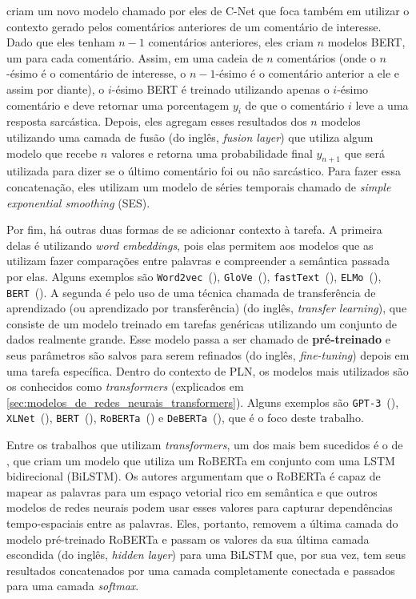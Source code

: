 \cite{jena-etal:2020:cnet} criam um novo modelo chamado por eles de C-Net que
foca também em utilizar o contexto gerado pelos comentários anteriores de um
comentário de interesse. Dado que eles tenham $n-1$ comentários anteriores, eles
criam $n$ modelos BERT, um para cada comentário. Assim, em uma cadeia de $n$
comentários (onde o $n$-ésimo é o comentário de interesse, o $n-1$-ésimo é o
comentário anterior a ele e assim por diante), o $i$-ésimo BERT é treinado
utilizando apenas o $i$-ésimo comentário e deve retornar uma porcentagem $y_i$
de que o comentário $i$ leve a uma resposta sarcástica. Depois, eles agregam
esses resultados dos $n$ modelos utilizando uma camada de fusão (do inglês,
\textit{fusion layer}) que utiliza algum modelo que recebe $n$ valores e retorna
uma probabilidade final $y_{n+1}$ que será utilizada para dizer se o último
comentário foi ou não sarcástico. Para fazer essa concatenação, eles utilizam
um modelo de séries temporais chamado de \textit{simple exponential smoothing}
(SES).

Por fim, há outras duas formas de se adicionar contexto à tarefa. A primeira
delas é utilizando \textit{word embeddings}, pois elas permitem aos modelos que
as utilizam fazer comparações entre palavras e compreender a semântica passada
por elas. Alguns exemplos são
\texttt{Word2vec}~(\cite{mikolov-etal:2013:word2vec}),
\texttt{GloVe}~(\cite{pennington-etal:2014:glove}),
\texttt{fastText}~(\cite{bojanowski-etal:2016:fasttext}),
\texttt{ELMo}~(\cite{peters-etal:2018:elmo}),
\texttt{BERT}~(\cite{devlin-etal:2018:bert}).
A segunda é pelo uso de uma técnica chamada de transferência de aprendizado (ou
aprendizado por transferência) (do inglês, \textit{transfer learning}),
que consiste de um modelo treinado em tarefas genéricas utilizando um conjunto
de dados realmente grande. Esse modelo passa a ser chamado de
\textbf{pré-treinado} e seus parâmetros são salvos para serem refinados (do
inglês, \textit{fine-tuning}) depois em uma tarefa específica.  Dentro do
contexto de PLN, os modelos mais utilizados são os conhecidos como
\textit{transformers} (explicados em
\ref{sec:modelos_de_redes_neurais_transformers}).
Alguns exemplos são
\texttt{GPT-3}~(\cite{brown-etal:2020:gpt3}),
\texttt{XLNet}~(\cite{yang-etal:2019:xlnet}),
\texttt{BERT}~(\cite{devlin-etal:2018:bert}),
\texttt{RoBERTa}~(\cite{liu-etal:2019:roberta})
e \texttt{DeBERTa}~(\cite{he-etal:2020:deberta}), que é o foco deste trabalho.

Entre os trabalhos que utilizam \textit{transformers}, um dos mais bem sucedidos
é o de \cite{potamias-etal:2020:transform-sarcasm}, que criam um modelo que
utiliza um RoBERTa em conjunto com uma LSTM bidirecional (BiLSTM). Os autores
argumentam que o RoBERTa é capaz de mapear as palavras para um espaço vetorial
rico em semântica e que outros modelos de redes neurais podem usar esses valores
para capturar dependências tempo-espaciais entre as palavras. Eles, portanto,
removem a última camada do modelo pré-treinado RoBERTa e passam os valores da
sua última camada escondida (do inglês, \textit{hidden layer}) para uma BiLSTM
que, por sua vez, tem seus resultados concatenados por uma camada completamente
conectada e passados para uma camada \textit{softmax}.

